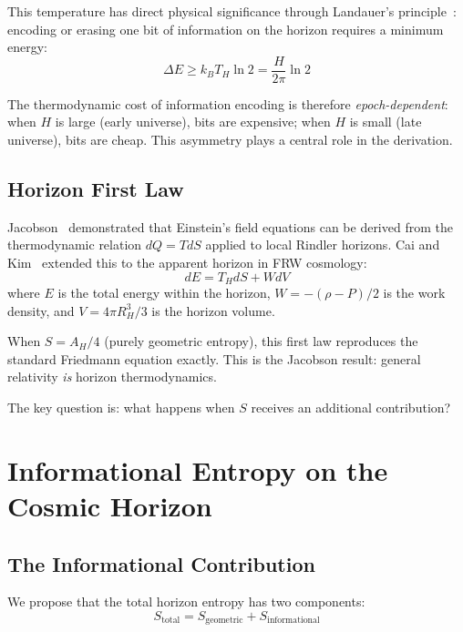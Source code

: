 \documentclass[twocolumn,superscriptaddress,prl,amsmath,amssymb]{revtex4-2}
\begin{document}
This temperature has direct physical significance through Landauer's principle~\cite{Landauer1961}: encoding or erasing one bit of information on the horizon requires a minimum energy:
\begin{equation}
\Delta E \geq k_B T_H \ln 2 = \frac{H}{2\pi} \ln 2
\label{eq:Landauer}
\end{equation}

The thermodynamic cost of information encoding is therefore \textit{epoch-dependent}: when $H$ is large (early universe), bits are expensive; when $H$ is small (late universe), bits are cheap. This asymmetry plays a central role in the derivation.

\subsection{Horizon First Law}

Jacobson~\cite{Jacobson1995} demonstrated that Einstein's field equations can be derived from the thermodynamic relation $dQ = TdS$ applied to local Rindler horizons. Cai and Kim~\cite{Cai2005} extended this to the apparent horizon in FRW cosmology:
\begin{equation}
dE = T_H dS + W dV
\label{eq:firstlaw}
\end{equation}
where $E$ is the total energy within the horizon, $W = -(\rho - P)/2$ is the work density, and $V = 4\pi R_H^3/3$ is the horizon volume.

When $S = A_H/4$ (purely geometric entropy), this first law reproduces the standard Friedmann equation exactly. This is the Jacobson result: general relativity \textit{is} horizon thermodynamics.

The key question is: what happens when $S$ receives an additional contribution?

\section{Informational Entropy on the Cosmic Horizon}
\label{sec:informational}

\subsection{The Informational Contribution}

We propose that the total horizon entropy has two components:
\begin{equation}
S_\text{total} = S_\text{geometric} + S_\text{informational}
\label{eq:Stotal}
\end{equation}
\end{document}
